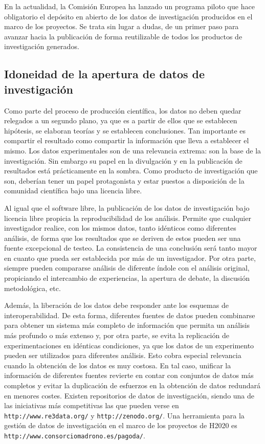 \documentclass[10pt,twoside,spanish]{article}
\numberwithin{equation}{section}
\begin{document}
En la actualidad, la Comisión Europea ha lanzado un programa piloto que hace obligatorio el depósito en abierto de los datos de investigación producidos en el marco de los proyectos. Se trata sin lugar a dudas, de un primer paso para avanzar hacia la publicación de forma reutilizable de todos los productos de investigación generados.

\subsection{Idoneidad de la apertura de datos de investigación}

Como parte del proceso de producción científica, los datos no deben quedar relegados a un segundo plano, ya que es a partir de ellos que se establecen hipótesis, se elaboran teorías y se establecen conclusiones. Tan importante es compartir el resultado como compartir la información que lleva a establecer el mismo. Los datos experimentales son de una relevancia extrema: son la base de la investigación. Sin embargo su papel en la divulgación y en la publicación de resultados está prácticamente en la sombra. Como producto de investigación que son, deberían tener un papel protagonista y estar puestos a disposición de la comunidad científica bajo una licencia libre.

Al igual que el software libre, la publicación de los datos de investigación bajo licencia libre propicia la reproducibilidad de los análisis. Permite que cualquier investigador realice, con los mismos datos, tanto idénticos como diferentes análisis, de forma que los resultados que se deriven de estos pueden ser una fuente excepcional  de testeo. La consistencia de una conclusión será tanto mayor en cuanto que pueda ser establecida por más de un investigador. Por otra parte, siempre pueden compararse análisis de diferente índole con el análisis original, propiciando el intercambio de experiencias, la apertura de debate, la discusión metodológica, etc.

Además, la liberación de los datos debe responder ante los esquemas de interoperabilidad. De esta forma, diferentes fuentes de datos pueden combinarse para obtener un sistema más completo de información que permita un análisis más profundo o más extenso y, por otra parte, se evita la replicación de experimentaciones en idénticas condiciones, ya que los datos de un experimento pueden ser utilizados para diferentes análisis. Esto cobra especial relevancia cuando la obtención de los datos es muy costosa. En tal caso, unificar la información de diferentes fuentes  revierte en contar con conjuntos de datos más completos y evitar la duplicación de esfuerzos en la obtención de datos redundará en menores costes. Existen repositorios de datos de investigación, siendo una de las iniciativas más competitivas las que pueden verse en \texttt{http://www.re3data.org/} y \texttt{http://zenodo.org/}. Una herramienta para la gestión de datos de investigación en el marco de los proyectos de H2020 es \texttt{http://www.consorciomadrono.es/pagoda/}.
\end{document}
